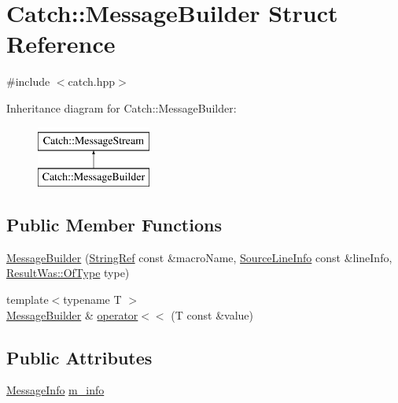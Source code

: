 \hypertarget{struct_catch_1_1_message_builder}{}\section{Catch\+::Message\+Builder Struct Reference}
\label{struct_catch_1_1_message_builder}


{\ttfamily \#include $<$catch.\+hpp$>$}

Inheritance diagram for Catch\+::Message\+Builder\+:\begin{figure}[H]
\begin{center}
\leavevmode
\includegraphics[height=2.000000cm]{struct_catch_1_1_message_builder}
\end{center}
\end{figure}
\subsection*{Public Member Functions}
\begin{DoxyCompactItemize}
\item 
\mbox{\hyperlink{struct_catch_1_1_message_builder_ac34832ca527a758f000ac233d32dd068}{Message\+Builder}} (\mbox{\hyperlink{class_catch_1_1_string_ref}{String\+Ref}} const \&macro\+Name, \mbox{\hyperlink{struct_catch_1_1_source_line_info}{Source\+Line\+Info}} const \&line\+Info, \mbox{\hyperlink{struct_catch_1_1_result_was_a624e1ee3661fcf6094ceef1f654601ef}{Result\+Was\+::\+Of\+Type}} type)
\item 
{\footnotesize template$<$typename T $>$ }\\\mbox{\hyperlink{struct_catch_1_1_message_builder}{Message\+Builder}} \& \mbox{\hyperlink{struct_catch_1_1_message_builder_a20fa48d069b20dddcc2d3df8abb123c1}{operator$<$$<$}} (T const \&value)
\end{DoxyCompactItemize}
\subsection*{Public Attributes}
\begin{DoxyCompactItemize}
\item 
\mbox{\hyperlink{struct_catch_1_1_message_info}{Message\+Info}} \mbox{\hyperlink{struct_catch_1_1_message_builder_a979f1c2b36d78f80ee275bfa5ba0209f}{m\+\_\+info}}
\end{DoxyCompactItemize}


